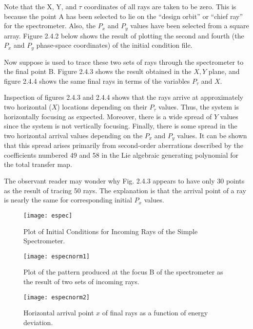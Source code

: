      Note that the X, Y, and $\tau$ coordinates of all rays are taken to be
zero. This is because the point A has been selected to lie on the ``design
orbit'' or ``chief ray'' for the spectrometer.  Also, the $P_x$  and $P_y$  values
have been selected from a square array.  Figure 2.4.2 below shows the result
of plotting the second and fourth (the $P_x$  and $P_y$  phase-space coordinates)
of the initial condition file.

     Now suppose \Mary is used to trace these two sets of rays through
the spectrometer to the final point B\@.  Figure 2.4.3 shows the result
obtained in the $X,Y$ plane, and figure 2.4.4 shows the same final rays in
terms of the variables $P_{\tau}$  and $X$.


     Inspection of figures 2.4.3 and 2.4.4 shows that the rays arrive at
approximately two horizontal ($X$) locations depending on their $P_{\tau}$  values.
Thus, the system is horizontally focusing as expected.  Moreover, there is
a wide spread of $Y$ values since the system is not vertically focusing.
Finally, there is some spread in the two horizontal arrival values
depending on the $P_x$  and $P_y$  values.  It can be shown that this spread arises
primarily from second-order aberrations described by the coefficients
numbered 49 and 58 in the Lie algebraic generating polynomial for the total
transfer map.

     The observant reader may wonder why Fig. 2.4.3 appears to have only 30
points as the result of tracing 50 rays.  The explanation is that the
arrival point of a ray is nearly the same for corresponding  initial $P_x$
values.

\begin{figure}[hbp]
  \centering
  \texttt{[image: espec]}
  \caption{Plot of Initial Conditions for
                Incoming Rays of the Simple Spectrometer.}
\end{figure}

\begin{figure}[hbp]
  \centering
  \texttt{[image: especnorm1]}
  \caption{Plot of the pattern produced at the focus B of
        the spectrometer as the result of two sets of incoming rays.}
\end{figure}
\clearpage

\begin{figure}[hbp]
  \centering
  \texttt{[image: especnorm2]}
  \caption{Horizontal arrival point $x$ of final rays
            as a function of energy deviation.}
\end{figure}

